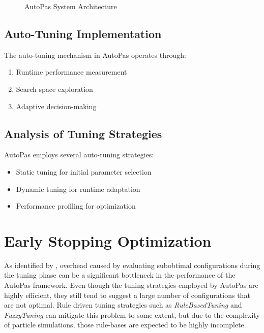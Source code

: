 \documentclass[conference]{IEEEtran}
\begin{document}
\begin{figure}[!t]
    \centering
    \caption{AutoPas System Architecture}
    \label{fig_architecture}
\end{figure}

\subsection{Auto-Tuning Implementation}
The auto-tuning mechanism in AutoPas operates through:

\begin{enumerate}
    \item Runtime performance measurement
    \item Search space exploration
    \item Adaptive decision-making
\end{enumerate}

\subsection{Analysis of Tuning Strategies}

AutoPas employs several auto-tuning strategies:

\begin{itemize}
    \item Static tuning for initial parameter selection
    \item Dynamic tuning for runtime adaptation
    \item Performance profiling for optimization
\end{itemize}

\newpage
\newpage

\section{Early Stopping Optimization}

As identified by \cite{autopas_issue673}\cite{endreport.pdf}\cite{Manuel_Lerchner_Thesis.pdf}, overhead caused by evaluating subobtimal configurations during the tuning phase can be a significant bottleneck in the performance of the AutoPas framework. Even though the tuning strategies employed by AutoPas are highly efficient, they still tend to suggest a large number of configurations that are not optimal. Rule driven tuning strategies such as \textit{RuleBasedTuning} and \textit{FuzzyTuning} can mitigate this problem to some extent, but due to the complexity of particle simulations, those rule-bases are expected to be highly incomplete.
\end{document}
